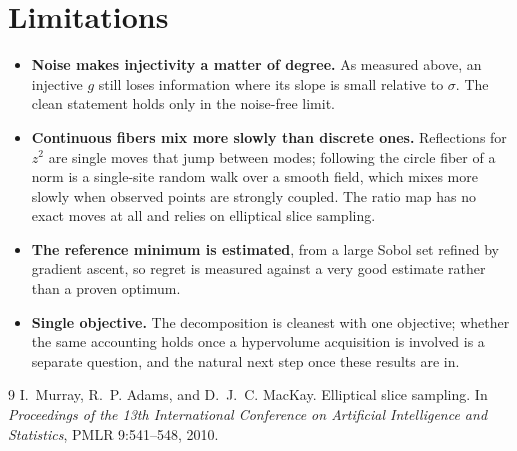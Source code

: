 \documentclass[11pt]{article}
\begin{document}
\section{Limitations}

\begin{itemize}
\item \textbf{Noise makes injectivity a matter of degree.} As measured above,
an injective $g$ still loses information where its slope is small relative to
$\sigma$. The clean statement holds only in the noise-free limit.
\item \textbf{Continuous fibers mix more slowly than discrete ones.} Reflections
for $z^2$ are single moves that jump between modes; following the circle fiber of
a norm is a single-site random walk over a smooth field, which mixes more slowly
when observed points are strongly coupled. The ratio map has no exact moves at
all and relies on elliptical slice sampling.
\item \textbf{The reference minimum is estimated}, from a large Sobol set
refined by gradient ascent, so regret is measured against a very good estimate
rather than a proven optimum.
\item \textbf{Single objective.} The decomposition is cleanest with one
objective; whether the same accounting holds once a hypervolume acquisition is
involved is a separate question, and the natural next step once these results
are in.
\end{itemize}

\begin{thebibliography}{9}
I.~Murray, R.~P. Adams, and D.~J.~C. MacKay.
Elliptical slice sampling.
In \emph{Proceedings of the 13th International Conference on Artificial
Intelligence and Statistics}, PMLR 9:541--548, 2010.
\end{thebibliography}
\end{document}
